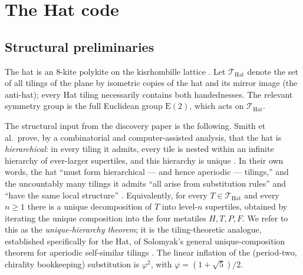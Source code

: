 \documentclass[a4paper,unpublished]{quantumarticle}
\theoremstyle{remark}
\newcommand{\THat}{\mathcal{T}_{\mathrm{Hat}}}
\newcommand{\Etwo}{\mathrm{E}(2)}
\newcommand{\gphi}{\varphi}
\begin{document}
\section{The Hat code}
\label{sec:hat}

\subsection{Structural preliminaries}
\label{sec:hat-pf}

The hat is an 8-kite polykite on the kisrhombille lattice
\cite{Smith2024hat}. Let $\THat$ denote the set of all tilings of the
plane by isometric copies of the hat and its mirror image (the
anti-hat); every Hat tiling necessarily contains both handednesses.
The relevant symmetry group is the full Euclidean group $\Etwo$,
which acts on $\THat$.

The structural input from the discovery paper is the following.
Smith et al.\ prove, by a combinatorial and computer-assisted
analysis, that the hat is \emph{hierarchical}: in every tiling it
admits, every tile is nested within an infinite hierarchy of
ever-larger supertiles, and this hierarchy is unique
\cite[\S 5]{Smith2024hat}. In their own words, the hat ``must form
hierarchical --- and hence aperiodic --- tilings,'' and the
uncountably many tilings it admits ``all arise from substitution
rules'' and ``have the same local structure''
\cite[Abstract and \S 1]{Smith2024hat}. Equivalently, for every
$T \in \THat$ and every $n \geq 1$ there is a unique decomposition of
$T$ into level-$n$ supertiles, obtained by iterating the unique
composition into the four metatiles $H, T, P, F$. We refer to this as
the \emph{unique-hierarchy theorem}; it is the tiling-theoretic
analogue, established specifically for the Hat, of Solomyak's general
unique-composition theorem for aperiodic self-similar tilings
\cite{Solomyak1998, Solomyak1997}. The linear inflation of the (period-two,
chirality bookkeeping) substitution is $\gphi^{2}$, with
$\gphi = (1+\sqrt{5})/2$.
\end{document}
